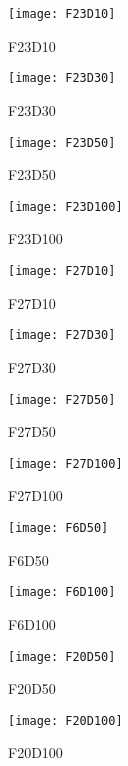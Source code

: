 \begin{figure*}[h!]
    \begin{subfigure}[b]{0.24\textwidth}
        \texttt{[image: F23D10]}
        \caption{F23D10}
    \end{subfigure}
    \begin{subfigure}[b]{0.24\textwidth}
        \texttt{[image: F23D30]}
        \caption{F23D30}
    \end{subfigure}    
    \begin{subfigure}[b]{0.24\textwidth}
        \texttt{[image: F23D50]}
        \caption{F23D50}
    \end{subfigure}
    \begin{subfigure}[b]{0.24\textwidth}
        \texttt{[image: F23D100]}
        \caption{F23D100}
    \end{subfigure}

    \begin{subfigure}[b]{0.24\textwidth}
        \texttt{[image: F27D10]}
        \caption{F27D10}
    \end{subfigure}
    \begin{subfigure}[b]{0.24\textwidth}
        \texttt{[image: F27D30]}
        \caption{F27D30}
    \end{subfigure}    
    \begin{subfigure}[b]{0.24\textwidth}
        \texttt{[image: F27D50]}
        \caption{F27D50}
    \end{subfigure}
    \begin{subfigure}[b]{0.24\textwidth}
        \texttt{[image: F27D100]}
        \caption{F27D100}
    \end{subfigure}

    \begin{subfigure}[b]{0.24\textwidth}
        \texttt{[image: F6D50]}
        \caption{F6D50}
    \end{subfigure}
    \begin{subfigure}[b]{0.24\textwidth}
        \texttt{[image: F6D100]}
        \caption{F6D100}
    \end{subfigure}
    \begin{subfigure}[b]{0.24\textwidth}
        \texttt{[image: F20D50]}
        \caption{F20D50}
    \end{subfigure}
    \begin{subfigure}[b]{0.24\textwidth}
        \texttt{[image: F20D100]}
        \caption{F20D100}
    \end{subfigure}


\end{figure*}
